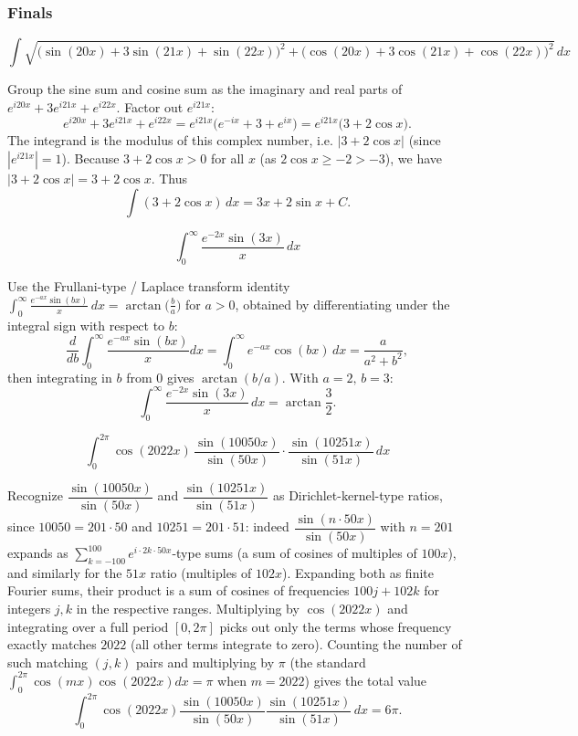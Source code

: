 \subsubsection*{Finals}
\begin{questions}

\question \[\int \sqrt{\big(\sin(20x)+3\sin(21x)+\sin(22x)\big)^2+\big(\cos(20x)+3\cos(21x)+\cos(22x)\big)^2}\, dx\]
\begin{solution}
Group the sine sum and cosine sum as the imaginary and real parts of $e^{i20x}+3e^{i21x}+e^{i22x}$. Factor out $e^{i21x}$:
\[
e^{i20x}+3e^{i21x}+e^{i22x}=e^{i21x}\big(e^{-ix}+3+e^{ix}\big)=e^{i21x}\big(3+2\cos x\big).
\]
The integrand is the modulus of this complex number, i.e. $|3+2\cos x|$ (since $|e^{i21x}|=1$). Because $3+2\cos x>0$ for all $x$ (as $2\cos x\ge -2>-3$), we have $|3+2\cos x|=3+2\cos x$. Thus
\[
\int (3+2\cos x)\,dx = 3x+2\sin x + C.
\]
\end{solution}

\question \[\int_0^{\infty} \frac{e^{-2x}\sin(3x)}{x}\, dx\]
\begin{solution}
Use the Frullani-type / Laplace transform identity $\displaystyle\int_0^\infty \frac{e^{-ax}\sin(bx)}{x}\,dx=\arctan\!\Big(\frac ba\Big)$ for $a>0$, obtained by differentiating under the integral sign with respect to $b$:
\[
\frac{d}{db}\int_0^\infty \frac{e^{-ax}\sin(bx)}{x}dx = \int_0^\infty e^{-ax}\cos(bx)\,dx=\frac{a}{a^2+b^2},
\]
then integrating in $b$ from $0$ gives $\arctan(b/a)$. With $a=2,\,b=3$:
\[
\int_0^{\infty} \frac{e^{-2x}\sin(3x)}{x}\, dx = \arctan\frac32.
\]
\end{solution}

\question \[\int_0^{2\pi} \cos(2022x)\,\frac{\sin(10050x)}{\sin(50x)}\cdot\frac{\sin(10251x)}{\sin(51x)}\, dx\]
\begin{solution}
Recognize $\dfrac{\sin(10050x)}{\sin(50x)}$ and $\dfrac{\sin(10251x)}{\sin(51x)}$ as Dirichlet-kernel-type ratios, since $10050=201\cdot50$ and $10251=201\cdot51$: indeed $\dfrac{\sin(n\cdot50x)}{\sin(50x)}$ with $n=201$ expands as $\sum_{k=-100}^{100} e^{i\cdot2k\cdot50x}$-type sums (a sum of cosines of multiples of $100x$), and similarly for the $51x$ ratio (multiples of $102x$). Expanding both as finite Fourier sums, their product is a sum of cosines of frequencies $100j+102k$ for integers $j,k$ in the respective ranges. Multiplying by $\cos(2022x)$ and integrating over a full period $[0,2\pi]$ picks out only the terms whose frequency exactly matches $2022$ (all other terms integrate to zero). Counting the number of such matching $(j,k)$ pairs and multiplying by $\pi$ (the standard $\int_0^{2\pi}\cos(mx)\cos(2022x)dx=\pi$ when $m=2022$) gives the total value
\[
\int_0^{2\pi} \cos(2022x)\frac{\sin(10050x)}{\sin(50x)}\frac{\sin(10251x)}{\sin(51x)}\, dx = 6\pi.
\]
\end{solution}


\end{questions}
